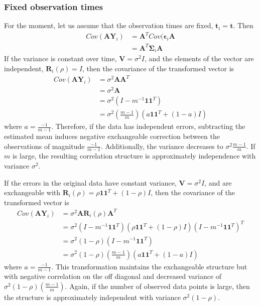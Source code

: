 \documentclass[12pt]{article}
\newcommand{\B}[0]{\mathbf}
\newcommand{\bs}[0]{\boldsymbol}
\begin{document}
\subsubsection{Fixed observation times}
For the moment, let us assume that the observation times are fixed, $\B t_{i}=\B t$. Then
\begin{align*}
Cov(\B A\B Y_{i})&= \B A^{T}Cov(\bs\epsilon_{i}\B A\\
&= \B A^{T}\B\Sigma_{i} \B A
\end{align*}
If the variance is constant over time, $\B V=\sigma^{2}I$, and the elements of the vector are independent, $\B R_{i}(\rho)=I$, then the covariance of the transformed vector is
\begin{align*} 
Cov(\B A\B Y_{i}) &= \sigma^{2}\B A\B A^{T} \\
&=\sigma^{2}\B A\\
&= \sigma^{2}(I - m^{-1}\B1\B1^{T})\\
&=\sigma^{2}\left(\frac{m-1}{m}\right)(a\B 1\B 1^{T}+ (1-a)I)
\end{align*}
 where $a=\frac{-1}{m-1}$. Therefore, if the data has independent errors, subtracting the estimated mean induces negative exchangeable correction between the observations of magnitude $\frac{-1}{m-1}$. Additionally, the variance decreases to $\sigma^{2}\frac{m-1}{m}$. If $m$ is large, the resulting correlation structure is approximately independence with variance $\sigma^{2}$.
 
 If the errors in the original data have constant variance, $\B V=\sigma^{2}I$, and are exchangeable with $\B R_{i}(\rho) = \rho\B 1 \B 1^{T} + (1-\rho) I$, then the covariance of the transformed vector is
 \begin{align*}
 Cov(\B A\B Y_{i}) &= \sigma^{2}\B A\B R_{i}(\rho)\B A^{T}\\
 &= \sigma^{2}(I-m^{-1}\B1\B1^{T})(\rho\B1\B1^{T}+(1-\rho)I)(I-m^{-1}\B1\B1^{T})^{T}\\
 &= \sigma^{2}(1-\rho)(I-m^{-1}\B1\B1^{T})\\
 &=\sigma^{2}(1-\rho)\left(\frac{m-1}{m}\right)(a\B 1\B 1^{T}+ (1-a)I)
 \end{align*} 
 where $a=\frac{-1}{m-1}$. This transformation maintains the exchangeable structure but with negative correlation on the off diagonal and decreased variance of $\sigma^{2}(1-\rho)\left(\frac{m-1}{m}\right)$.  Again, if the number of observed data points is large, then the structure is approximately independent with variance $\sigma^{2}(1-\rho)$.
\end{document}
